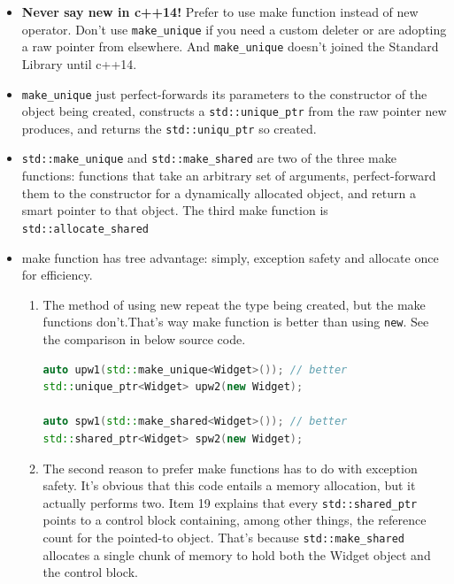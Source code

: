 \documentclass[a4paper,11pt,twoside]{book}
\begin{document}
\begin{itemize}
	\item \textbf{Never say new in c++14!} Prefer to use make function instead of new operator. Don't use \texttt{make\_unique} if you need a custom deleter or are adopting a raw pointer from elsewhere. And \texttt{make\_unique} doesn't joined the Standard Library until c++14.
	
	\item \texttt{make\_unique} just perfect-forwards its parameters to the constructor of the object being created, constructs a \texttt{std::unique\_ptr} from the raw pointer new produces, and returns the \texttt{std::uniqu\_ptr} so created.
	
	\item \texttt{std::make\_unique} and \texttt{std::make\_shared} are two of the three make functions: functions that take an arbitrary set of arguments, perfect-forward them to the constructor for a dynamically allocated object, and return a smart pointer to that object. The third make function is \texttt{std::allocate\_shared}
	
	\item make function has tree advantage: simply, exception safety and allocate once for efficiency.
	
	\begin{enumerate}
		\item The method of using new repeat the type being created, but the make functions don't.That's way make function is better than using \texttt{new}. See the comparison in below source code. 
\begin{lstlisting}[frame=single, language=c++, mathescape=true]
auto upw1(std::make_unique<Widget>()); // better
std::unique_ptr<Widget> upw2(new Widget); 
		
auto spw1(std::make_shared<Widget>()); // better
std::shared_ptr<Widget> spw2(new Widget); 
\end{lstlisting}
		
		\item The second reason to prefer make functions has to do with exception safety. It's obvious that this code entails a memory allocation, but it actually performs two. Item 19 explains that every \texttt{std::shared\_ptr} points to a control block containing, among other things, the reference count for the pointed-to object. That's because \texttt{std::make\_shared} allocates a single chunk of memory to hold both the Widget object and the control block.
		
	\end{enumerate}
	

\end{itemize}
\end{document}
